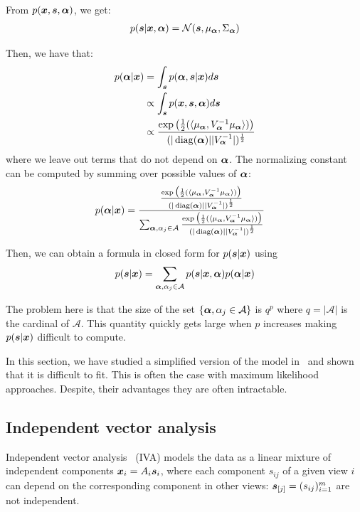 From $p(\boldsymbol{x}, \boldsymbol{s}, \boldsymbol{\alpha})$, we get:
\begin{align}
  p(\boldsymbol{s} | \boldsymbol{x}, \boldsymbol{\alpha}) =  \mathcal{N}(\boldsymbol{s}, \mu_{\boldsymbol{\alpha}}, \Sigma_{\boldsymbol{\alpha}})
\end{align}

Then, we have that:
\begin{align}
  p(\boldsymbol{\alpha} | \boldsymbol{x}) &= \int_{\boldsymbol{s}} p(\boldsymbol{\alpha}, \boldsymbol{s} | \boldsymbol{x}) d\boldsymbol{s} \\
                    &\propto \int_{\boldsymbol{s}} p(\boldsymbol{x}, \boldsymbol{s} ,\boldsymbol{\alpha}) d\boldsymbol{s} \\ 
                   &\propto \frac{\exp\big(\frac12(\langle{ \mu_{\boldsymbol{\alpha}} },{V_{\boldsymbol{\alpha}}^{-1} \mu_{\boldsymbol{\alpha}} }\rangle) \big)}{(|\operatorname*{diag}(\boldsymbol{\alpha})| |V_{\boldsymbol{\alpha}}^{-1}|)^{\frac12}}\\ 
\end{align}
where we leave out terms that do not depend on $\boldsymbol{\alpha}$.
The normalizing constant can be computed by summing over possible values of
$\boldsymbol{\alpha}$:
\begin{align}
  p(\boldsymbol{\alpha} | \boldsymbol{x}) &= \frac{\frac{\exp\big(\frac12(\langle{ \mu_{\boldsymbol{\alpha}} },{V_{\boldsymbol{\alpha}}^{-1} \mu_{\boldsymbol{\alpha}} }\rangle) \big)}{(|\operatorname*{diag}(\boldsymbol{\alpha})| |V_{\boldsymbol{\alpha}}^{-1}|)^{\frac12}}}{\sum_{\boldsymbol{\alpha}, \alpha_j \in \mathcal{A}} \frac{\exp\big(\frac12(\langle{ \mu_{\boldsymbol{\alpha}} },{V_{\boldsymbol{\alpha}}^{-1} \mu_{\boldsymbol{\alpha}} }\rangle) \big)}{(|\operatorname*{diag}(\boldsymbol{\alpha})| |V_{\boldsymbol{\alpha}}^{-1}|)^{\frac12}}}
\end{align}

Then, we can obtain a formula in closed form for $p(\boldsymbol{s} | \boldsymbol{x})$ using
\begin{align}
  p(\boldsymbol{s} | \boldsymbol{x}) = \sum_{\boldsymbol{\alpha}, \alpha_j \in \mathcal{A}} p(\boldsymbol{s} | \boldsymbol{x}, \boldsymbol{\alpha}) p(\boldsymbol{\alpha} | \boldsymbol{x})
\end{align}

The problem here is that the size of the set $\{\boldsymbol{\alpha}, \alpha_j \in
\mathcal{A} \}$ is $q^p$ where $q=|\mathcal{A}|$ is the cardinal of
$\mathcal{A}$. This quantity quickly gets large when $p$ increases making
$p(\boldsymbol{s} | \boldsymbol{x})$ difficult to compute.

In this section, we have studied a simplified version of the
model in~\cite{guo2008unified} and shown that it is difficult to fit. This is
often the case with maximum likelihood approaches. Despite, their advantages they
are often intractable.

\subsection{Independent vector analysis}
\label{sec:IVA}
Independent vector analysis~\cite{lee2008independent} (IVA) models the data as a
linear mixture of independent components $\boldsymbol{x}_i = A_i \boldsymbol{s}_i$, where each
component $s_{ij}$ of a given view $i$ can depend on the corresponding component
in other views: $\boldsymbol{s}_{[j]} = (s_{ij})_{i=1}^m$ are not independent.


